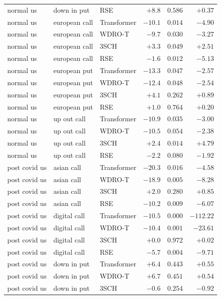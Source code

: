 \documentclass[11pt,oneside]{report}
\begin{document}
\begin{longtable}{lllrrr}
normal us & down in put & RSE        & $+8.8$  & $0.586$ & $+0.37$ \\
normal us & european call & Transformer & $-10.1$ & $0.014$ & $-4.90$ \\
normal us & european call & WDRO-T   & $-9.7$  & $0.030$ & $-3.27$ \\
normal us & european call & 3SCH     & $+3.3$  & $0.049$ & $+2.51$ \\
normal us & european call & RSE      & $-1.6$  & $0.012$ & $-5.13$ \\
normal us & european put & Transformer & $-13.3$ & $0.047$ & $-2.57$ \\
normal us & european put & WDRO-T    & $-12.4$ & $0.048$ & $-2.54$ \\
normal us & european put & 3SCH      & $+4.1$  & $0.262$ & $+0.89$ \\
normal us & european put & RSE       & $+1.0$  & $0.764$ & $+0.20$ \\
normal us & up out call & Transformer & $-10.9$ & $0.035$ & $-3.00$ \\
normal us & up out call & WDRO-T     & $-10.5$ & $0.054$ & $-2.38$ \\
normal us & up out call & 3SCH       & $+2.4$  & $0.014$ & $+4.79$ \\
normal us & up out call & RSE        & $-2.2$  & $0.080$ & $-1.92$ \\
\midrule
post covid us & asian call & Transformer & $-20.3$ & $0.016$ & $-4.58$ \\
post covid us & asian call & WDRO-T      & $-18.9$ & $0.005$ & $-8.28$ \\
post covid us & asian call & 3SCH        & $+2.0$  & $0.280$ & $+0.85$ \\
post covid us & asian call & RSE         & $-10.2$ & $0.009$ & $-6.07$ \\
post covid us & digital call & Transformer & $-10.5$ & $0.000$ & $-112.22$ \\
post covid us & digital call & WDRO-T    & $-10.4$ & $0.001$ & $-23.61$ \\
post covid us & digital call & 3SCH      & $+0.0$  & $0.972$ & $+0.02$ \\
post covid us & digital call & RSE       & $-5.7$  & $0.004$ & $-9.71$ \\
post covid us & down in put & Transformer & $+6.4$  & $0.443$ & $+0.55$ \\
post covid us & down in put & WDRO-T     & $+6.7$  & $0.451$ & $+0.54$ \\
post covid us & down in put & 3SCH       & $-0.6$  & $0.254$ & $-0.92$ \\

\end{longtable}
\end{document}
